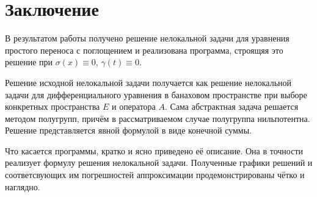 \documentclass{article}
\theoremstyle{definition}
\begin{document}
\newpage

\section*{Заключение}
В результатом работы получено решение нелокальной задачи для уравнения простого переноса с поглощением и реализована программа,
строящяя это решение при $\sigma(x) \equiv 0$, $\gamma(t) \equiv 0$. 

Решение исходной нелокальной задачи получается как решение нелокальной задачи для дифференциального уравнения в банаховом пространстве 
при выборе конкретных пространства $E$ и оператора $A$. Сама абстрактная задача решается методом полугрупп, причём в рассматриваемом 
случае полугруппа нильпотентна. Решение представляется явной формулой в виде конечной суммы. 

Что касается программы, кратко и ясно приведено её описание. Она в точности реализует формулу решения нелокальной задачи. Полученные графики решений и соответсвующих им погрешностей аппроксимации продемонстрированы чётко и наглядно.

\newpage
\end{document}
